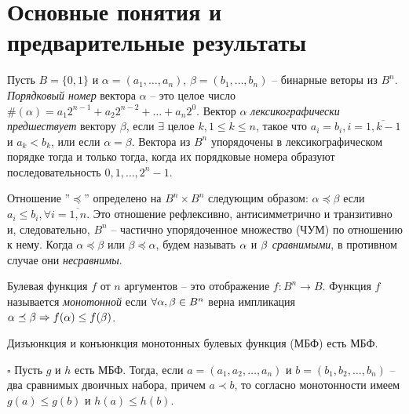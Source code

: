 \chapter{Основные понятия и предварительные результаты}
Пусть $B=\{0,1\}$ и $\alpha = (a_1, \dots, a_n)$, $\beta = (b_1, \dots, b_n)$ -- 
бинарные веторы из $B^n$. \emph{Порядковый номер} вектора
$\alpha$ -- это целое число 
$\#(\alpha) = a_1 2^{n-1} + a_2 2^{n-2} + \dots + a_n 2^0$.
Вектор $\alpha$ \emph{лексикографически предшествует} вектору 
$\beta$, если $\exists$ целое $k, 1 \leq k \leq n$, такое что
$a_i = b_i, i=\overline{1,k-1}$ и $a_k < b_k$, 
или если $\alpha = \beta$. Вектора из $B^n$ упорядочены
в лексикографическом порядке тогда и только тогда, когда 
их порядковые номера образуют последовательность $0, 1, \dots, 2^n - 1$.\par
Отношение ''$\preceq$'' определено на $B^n \times B^n$ следующим образом:
$\alpha \preceq \beta$  если 
$a_i \leq b_i, \forall i = \overline{1,n}$. 
Это отношение рефлексивно, антисимметрично и транзитивно и, следовательно,
$B^n$  -- частично упорядоченное множество (ЧУМ) по отношению к нему. 
Когда $\alpha \preceq \beta$ или $\beta \preceq \alpha$, будем называть
$\alpha$ и $\beta$ \emph{сравнимыми}, в противном случае они \emph{несравнимы}.\par
  Булевая функция $f$ от $n$ аргументов -- это отображение 
$f : B^n \rightarrow B$. Функция $f$ называется \emph{монотонной} 
если $\forall \alpha, \beta \in B^n$ верна импликация 
$\alpha \preceq \beta \Rightarrow f(\alpha) \leq f(\beta)$.
\begin{Theorem} 
Дизъюнкция и конъюнкция монотонных булевых функция (МБФ) есть МБФ.
\end{Theorem}
$\square$
 Пусть $g$ и $h$ есть МБФ. Тогда, если $a=(a_1, a_2, \dots , a_n)$ и $b=(b_1, b_2, \dots, b_n)$ --
        два сравнимых двоичных набора, причем $a \prec b$, то согласно монотонности имеем $g(a) \leq g(b)$
        и $h(a) \leq h(b)$.\\

